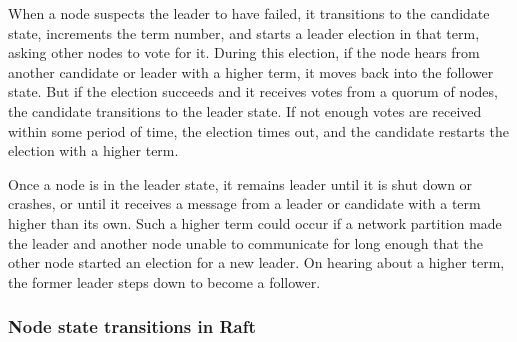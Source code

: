 When a node suspects the leader to have failed, it transitions to the candidate state, increments the term number, and starts a leader election in that term, asking other nodes to vote for it.
During this election, if the node hears from another candidate or leader with a higher term, it moves back into the follower state.
But if the election succeeds and it receives votes from a quorum of nodes, the candidate transitions to the leader state.
If not enough votes are received within some period of time, the election times out, and the candidate restarts the election with a higher term.

Once a node is in the leader state, it remains leader until it is shut down or crashes, or until it receives a message from a leader or candidate with a term higher than its own.
Such a higher term could occur if a network partition made the leader and another node unable to communicate for long enough that the other node started an election for a new leader.
On hearing about a higher term, the former leader steps down to become a follower.

\begin{frame}
    \label{s:raft-states}
    \frametitle{Node state transitions in Raft}
    \begin{center}
    \end{center}%
\end{frame}
\label{l:raft-states}

